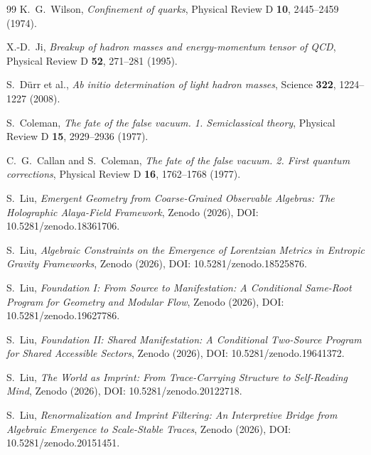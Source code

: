 \documentclass[12pt,a4paper]{article}
\theoremstyle{definition}
\theoremstyle{remark}
\begin{document}
\begin{thebibliography}{99}
K.~G.~Wilson, \emph{Confinement of quarks}, Physical Review D \textbf{10}, 2445--2459 (1974).

X.-D.~Ji, \emph{Breakup of hadron masses and energy-momentum tensor of QCD}, Physical Review D \textbf{52}, 271--281 (1995).

S.~D\"urr et al., \emph{Ab initio determination of light hadron masses}, Science \textbf{322}, 1224--1227 (2008).

S.~Coleman, \emph{The fate of the false vacuum. 1. Semiclassical theory}, Physical Review D \textbf{15}, 2929--2936 (1977).

C.~G.~Callan and S.~Coleman, \emph{The fate of the false vacuum. 2. First quantum corrections}, Physical Review D \textbf{16}, 1762--1768 (1977).

S.~Liu, \emph{Emergent Geometry from Coarse-Grained Observable Algebras: The Holographic Alaya-Field Framework}, Zenodo (2026), DOI: 10.5281/zenodo.18361706.

S.~Liu, \emph{Algebraic Constraints on the Emergence of Lorentzian Metrics in Entropic Gravity Frameworks}, Zenodo (2026), DOI: 10.5281/zenodo.18525876.

S.~Liu, \emph{Foundation I: From Source to Manifestation: A Conditional Same-Root Program for Geometry and Modular Flow}, Zenodo (2026), DOI: 10.5281/zenodo.19627786.

S.~Liu, \emph{Foundation II: Shared Manifestation: A Conditional Two-Source Program for Shared Accessible Sectors}, Zenodo (2026), DOI: 10.5281/zenodo.19641372.

S.~Liu, \emph{The World as Imprint: From Trace-Carrying Structure to Self-Reading Mind}, Zenodo (2026), DOI: 10.5281/zenodo.20122718.

S.~Liu, \emph{Renormalization and Imprint Filtering: An Interpretive Bridge from Algebraic Emergence to Scale-Stable Traces}, Zenodo (2026), DOI: 10.5281/zenodo.20151451.

\end{thebibliography}
\end{document}
